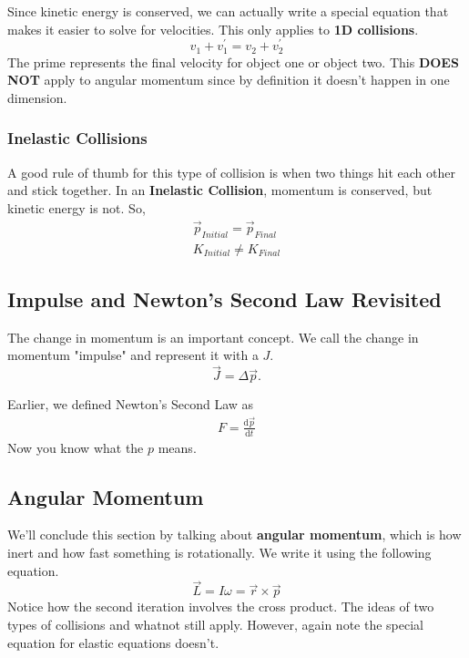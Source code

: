 Since kinetic energy is conserved, we can actually write a special equation that makes it easier to solve for velocities. This only applies to
\textbf{1D collisions}.
\begin{equation}
    v_1 + v_1^\prime = v_2 + v_2^\prime
\end{equation}
The prime represents the final velocity for object one or object two. This \textbf{DOES NOT} apply to angular momentum since by definition it doesn't
happen in one dimension.

\subsubsection{Inelastic Collisions}
A good rule of thumb for this type of collision is when two things hit each other and stick together. In an \textbf{Inelastic Collision}, momentum is
conserved, but kinetic energy is not. So,
\begin{eqnarray*}
    \vec{p}_{Initial} = \vec{p}_{Final} \\
    K_{Initial} \neq K_{Final}
\end{eqnarray*}

\subsection{Impulse and Newton's Second Law Revisited}
The change in momentum is an important concept. We call the change in momentum "impulse" and represent it with a $J$.
\begin{equation}
    \vec{J} = \Delta \vec{p}.
\end{equation}

Earlier, we defined Newton's Second Law as
\begin{eqnarray*}
    F = \frac{\text{d} \vec{p}}{\text{d}t}
\end{eqnarray*}
Now you know what the $p$ means.

\subsection{Angular Momentum}
We'll conclude this section by talking about \textbf{angular momentum}, which is how inert and how fast something is rotationally. We write it
using the following equation.
\begin{equation}
    \vec{L} = I \omega = \vec{r} \times \vec{p}
\end{equation}
Notice how the second iteration involves the cross product. The ideas of two types of collisions and whatnot still apply. However, again note the special
equation for elastic equations doesn't.

